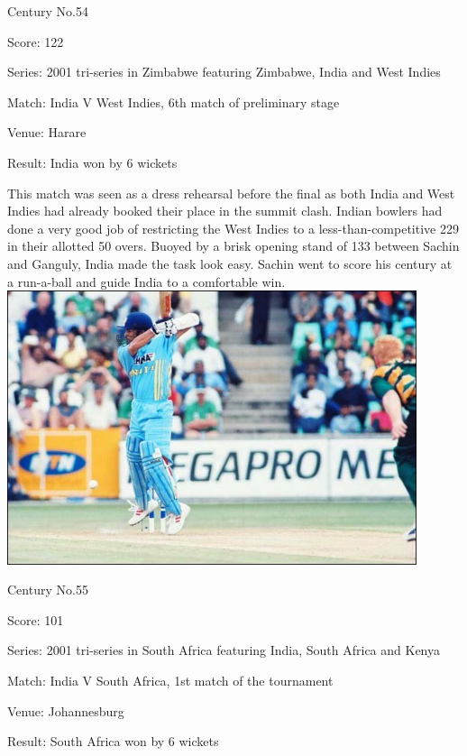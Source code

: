 \documentclass[11pt, a4paper]{article}
\begin{document}
Century No.54 

Score: 122 

Series: 2001 tri-series in Zimbabwe featuring Zimbabwe, India and West Indies 

Match: India V West Indies, 6th match of preliminary stage 

Venue: Harare 

Result: India won by 6 wickets 

This match was seen as a dress rehearsal before the final as both India and West Indies had already booked their place in the summit clash. Indian bowlers had done a very good job of restricting the West Indies to a less-than-competitive 229 in their allotted 50 overs. Buoyed by a brisk opening stand of 133 between Sachin and Ganguly, India made the task look easy. Sachin went to score his century at a run-a-ball and guide India to a comfortable win.
\newpage
\includegraphics[width=0.9\textwidth]{pics/55.jpg}

Century No.55 

Score: 101 

Series: 2001 tri-series in South Africa featuring India, South Africa and Kenya 

Match: India V South Africa, 1st match of the tournament 

Venue: Johannesburg 

Result: South Africa won by 6 wickets 
\end{document}

